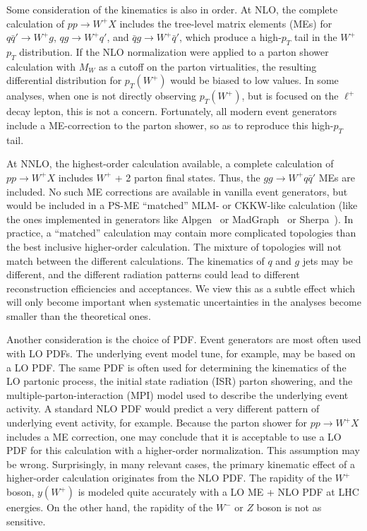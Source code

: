 Some consideration of the kinematics is also in order. At NLO, the
complete calculation of $pp\to W^+ X$ includes the tree-level matrix elements
(MEs) for $q\bar q'\to W^+ g$, $qg\to W^+ q'$, and $\bar{q} g\to W^+ \bar{q}'$,
which produce a high-$p_T$ tail in the $W^+$ $p_T$ distribution.  
If the NLO normalization were applied to a parton shower calculation 
with $M_W$ as a cutoff on the parton virtualities, the resulting differential
distribution for $p_T(W^+)$ would be biased to low values. In some
analyses, when one is not directly observing $p_T(W^+)$, but is focused on
the $\ell^+$ decay lepton, this is not a concern. Fortunately, all modern
event generators include a ME-correction to the parton shower, so as to reproduce 
this high-$p_T$ tail.

At NNLO, the highest-order calculation available, a complete calculation
of $pp\to W^+ X$ includes $W^+$ + 2 parton final states.  Thus, 
the $gg\to W^+ q\bar q'$ MEs are included.  No such ME corrections
are available in vanilla event generators, but would be included in
a PS-ME ``matched'' MLM- or CKKW-like calculation (like the ones implemented
in generators like Alpgen~\cite{alpgen} or MadGraph~\cite{madgraph} or 
Sherpa~\cite{sherpa}). In practice, a
``matched'' calculation may contain more complicated topologies
than the best inclusive higher-order calculation. The mixture of
topologies will not match between the different calculations.
The kinematics of $q$ and $g$ jets may be different, and the different
radiation patterns could lead to different reconstruction efficiencies
and acceptances.  We view this as a subtle effect which will only become
important when systematic uncertainties in the analyses become smaller 
than the theoretical ones.

Another consideration is the choice of PDF.  Event generators are most
often used with LO PDFs.  The underlying event model tune, for example,
may be based on a LO PDF.   The same PDF is often used for determining
the kinematics of the LO partonic process, the initial state radiation (ISR)
parton showering, and the multiple-parton-interaction (MPI) model used to 
describe the underlying event activity. A standard NLO PDF would predict
a very different pattern of underlying event activity, for example.
Because the parton shower for $pp\to W^+ X$ includes a ME correction,
one may conclude that it is acceptable to use a LO PDF for this calculation
with a higher-order normalization.   This assumption may be wrong.
Surprisingly, in many relevant cases, the primary kinematic effect of a 
higher-order calculation originates from the NLO PDF.  The rapidity
of the $W^+$ boson, $y(W^+)$ is modeled quite accurately with
a LO ME + NLO PDF at LHC energies.  
On the other hand, the
rapidity of the $W^-$ or $Z$ boson is not as sensitive.

